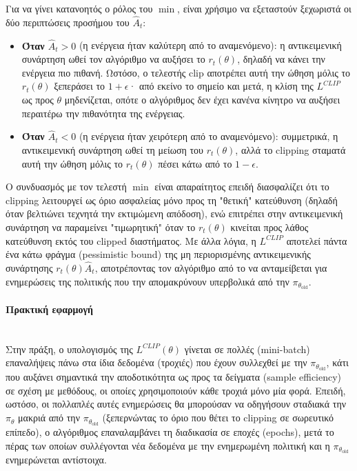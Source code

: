 \documentclass[12pt]{article}
\begin{document}
Για να γίνει κατανοητός ο ρόλος του $\min$, είναι χρήσιμο να εξεταστούν ξεχωριστά οι δύο περιπτώσεις προσήμου του $\hat{A}_t$:

\begin{itemize}
	\item \textbf{Όταν $\hat{A}_t > 0$} (η ενέργεια ήταν καλύτερη από το αναμενόμενο): η αντικειμενική συνάρτηση ωθεί τον αλγόριθμο να αυξήσει το $r_t(\theta)$, δηλαδή να κάνει την ενέργεια πιο πιθανή. Ωστόσο, ο τελεστής $\text{clip}$ αποτρέπει αυτή την ώθηση μόλις το $r_t(\theta)$ ξεπεράσει το $1+\epsilon$· από εκείνο το σημείο και μετά, η κλίση της $L^{CLIP}$ ως προς $\theta$ μηδενίζεται, οπότε ο αλγόριθμος δεν έχει κανένα κίνητρο να αυξήσει περαιτέρω την πιθανότητα της ενέργειας.
	\item \textbf{Όταν $\hat{A}_t < 0$} (η ενέργεια ήταν χειρότερη από το αναμενόμενο): συμμετρικά, η αντικειμενική συνάρτηση ωθεί τη μείωση του $r_t(\theta)$, αλλά το clipping σταματά αυτή την ώθηση μόλις το $r_t(\theta)$ πέσει κάτω από το $1-\epsilon$.
\end{itemize}

Ο συνδυασμός με τον τελεστή $\min$ είναι απαραίτητος επειδή διασφαλίζει ότι το clipping λειτουργεί ως όριο ασφαλείας μόνο προς τη "θετική" κατεύθυνση (δηλαδή όταν βελτιώνει τεχνητά την εκτιμώμενη απόδοση), ενώ επιτρέπει στην αντικειμενική συνάρτηση να παραμείνει "τιμωρητική" όταν το $r_t(\theta)$ κινείται προς λάθος κατεύθυνση εκτός του clipped διαστήματος. Με άλλα λόγια, η $L^{CLIP}$ αποτελεί πάντα ένα κάτω φράγμα (pessimistic bound) της μη περιορισμένης αντικειμενικής συνάρτησης $r_t(\theta)\hat{A}_t$, αποτρέποντας τον αλγόριθμο από το να ανταμείβεται για ενημερώσεις της πολιτικής που την απομακρύνουν υπερβολικά από την $\pi_{\theta_{\text{old}}}$.

\paragraph{Πρακτική εφαρμογή}~\\
Στην πράξη, ο υπολογισμός της $L^{CLIP}(\theta)$ γίνεται σε πολλές (mini-batch) επαναλήψεις πάνω στα ίδια δεδομένα (τροχιές) που έχουν συλλεχθεί με την $\pi_{\theta_{\text{old}}}$, κάτι που αυξάνει σημαντικά την αποδοτικότητα ως προς τα δείγματα (sample efficiency) σε σχέση με μεθόδους, οι οποίες χρησιμοποιούν κάθε τροχιά μόνο μία φορά. Επειδή, ωστόσο, οι πολλαπλές αυτές ενημερώσεις θα μπορούσαν να οδηγήσουν σταδιακά την $\pi_\theta$ μακριά από την $\pi_{\theta_{\text{old}}}$ (ξεπερνώντας το όριο που θέτει το clipping σε σωρευτικό επίπεδο), ο αλγόριθμος επαναλαμβάνει τη διαδικασία σε εποχές (epochs), μετά το πέρας των οποίων συλλέγονται νέα δεδομένα με την ενημερωμένη πολιτική και η $\pi_{\theta_{\text{old}}}$ ενημερώνεται αντίστοιχα.
\end{document}
